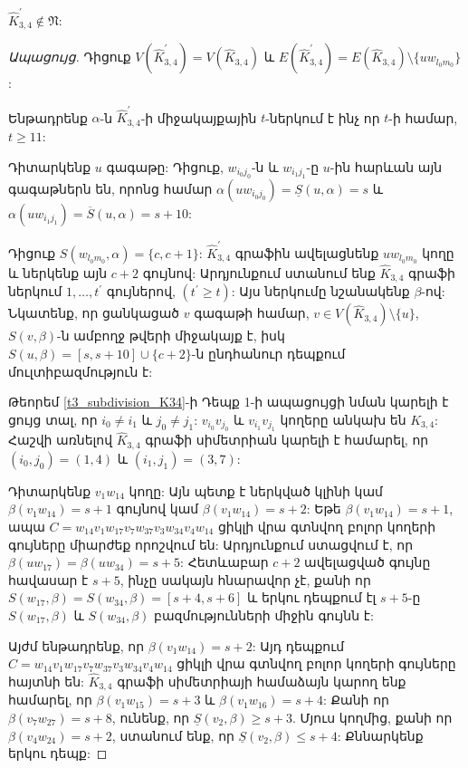 \begin{theorem}
\label{t3_subdivision_K34_prime} $\widehat{K}_{3,4}^{\prime}\notin
\mathfrak{N}$:
\end{theorem}
\begin{proof}[Ապացույց]
Դիցուք $V(\widehat{K}_{3,4}^{\prime})= V(\widehat{K}_{3,4})$
և $E(\widehat{K}_{3,4}^{\prime})=E(\widehat{K}_{3,4})\setminus
\{uw_{l_{0}m_{0}}\}$:

Ենթադրենք $\alpha$-ն $\widehat{K}_{3,4}^{\prime}$-ի միջակայքային 
$t$-ներկում է ինչ որ $t$-ի համար, $t\geq 11$:

Դիտարկենք $u$ գագաթը: Դիցուք, $w_{i_{0}j_{0}}$-ն և $w_{i_{1}j_{1}}$-ը $u$-ին հարևան այն գագաթներն են, որոնց համար
$\alpha(uw_{i_{0}j_{0}})=\underline{S}(u,\alpha)=s$ և
$\alpha(uw_{i_{1}j_{1}})=\overline{S}(u,\alpha)=s+10$:

Դիցուք $S(w_{l_{0}m_{0}},\alpha)=\{c,c+1\}$: $\widehat{K}_{3,4}^{\prime}$ գրաֆին ավելացնենք 
$uw_{l_{0}m_{0}}$ կողը և ներկենք այն $c+2$ գույնով: Արդյունքում ստանում ենք $\widehat{K}_{3,4}$ գրաֆի ներկում $1,\ldots,t^{\prime}$ գույներով, 
$(t^{\prime}\geq t)$: Այս ներկումը նշանակենք $\beta$-ով: Նկատենք, որ ցանկացած $v$ գագաթի համար, $v\in V(\widehat{K}_{3,4})\setminus \{u\}$,
$S(v,\beta)$-ն ամբողջ թվերի միջակայք է, իսկ 
$S(u,\beta)=[s,s+10]\cup \{c+2\}$-ն ընդհանուր դեպքում մուլտիբազմություն է:

Թեորեմ \ref{t3_subdivision_K34}-ի Դեպք 1-ի ապացույցի նման կարելի է ցույց տալ, որ $i_{0}\neq i_{1}$ և
$j_{0}\neq j_{1}$: $v_{i_{0}}v_{j_{0}}$ և
$v_{i_{1}}v_{j_{1}}$ կողերը անկախ են $K_{3,4}$: Հաշվի առնելով $\widehat{K}_{3,4}$ գրաֆի սիմետրիան կարելի է համարել, որ
$(i_{0},j_{0})=(1,4)$ և $(i_{1},j_{1})=(3,7)$:

Դիտարկենք $v_{1}w_{14}$ կողը: Այն պետք է ներկված կլինի կամ
$\beta(v_{1}w_{14})=s+1$ գույնով կամ $\beta(v_{1}w_{14})=s+2$: Եթե
$\beta(v_{1}w_{14})=s+1$, ապա $C=w_{14}v_{1}w_{17}v_{7}w_{37}v_{3}w_{34}v_{4}w_{14}$ ցիկլի վրա գտնվող բոլոր կողերի գույները միարժեք որոշվում են: Արդյունքում ստացվում է, որ $\beta(uw_{17})=\beta(uw_{34})=s+5$: Հետևաբար $c+2$ ավելացված գույնը հավասար է $s+5$, ինչը սակայն հնարավոր չէ, քանի որ
$S(w_{17},\beta)=S(w_{34},\beta)=[s+4,s+6]$ և երկու դեպքում էլ $s+5$-ը $S(w_{17},\beta)$ և
$S(w_{34},\beta)$ բազմությունների միջին գույնն է:

Այժմ ենթադրենք, որ $\beta(v_{1}w_{14})=s+2$: Այդ դեպքում 
$C=w_{14}v_{1}w_{17}v_{7}w_{37}v_{3}w_{34}v_{4}w_{14}$ ցիկլի վրա գտնվող բոլոր կողերի գույները հայտնի են: $\widehat{K}_{3,4}$ գրաֆի սիմետրիայի համաձայն կարող ենք համարել, որ $\beta(v_{1}w_{15})=s+3$ և $\beta(v_{1}w_{16})=s+4$:
Քանի որ $\beta(v_{7}w_{27})=s+8$, ունենք, որ $\underline{S}(v_{2},\beta)\geq
s+3$. Մյուս կողմից, քանի որ $\beta(v_{4}w_{24})=s+2$, ստանում ենք, որ
$\underline{S}(v_{2},\beta)\leq s+4$: Քննարկենք երկու դեպք:


\end{proof}
